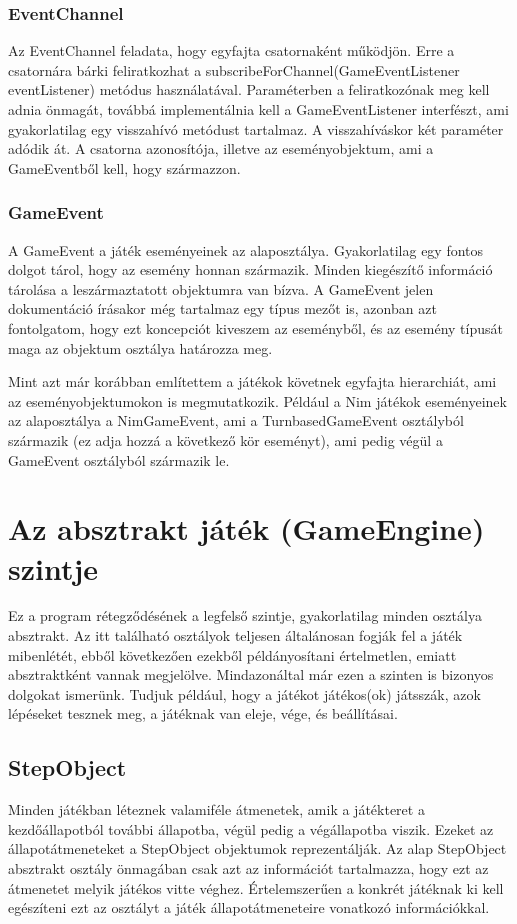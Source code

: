 \subsubsection{EventChannel}
Az EventChannel feladata, hogy egyfajta csatornaként működjön. Erre a csatornára bárki feliratkozhat a subscribeForChannel(GameEventListener eventListener) metódus használatával. Paraméterben a feliratkozónak meg kell adnia önmagát, továbbá implementálnia kell a GameEventListener interfészt, ami gyakorlatilag egy visszahívó metódust tartalmaz. A visszahíváskor két paraméter adódik át. A csatorna azonosítója, illetve az eseményobjektum, ami a GameEventből kell, hogy származzon.

\subsubsection{GameEvent}
A GameEvent a játék eseményeinek az alaposztálya. Gyakorlatilag egy fontos dolgot tárol, hogy az esemény honnan származik. Minden kiegészítő információ tárolása a leszármaztatott objektumra van bízva. A GameEvent jelen dokumentáció írásakor még tartalmaz egy típus mezőt is, azonban azt fontolgatom, hogy ezt koncepciót kiveszem az eseményből, és az esemény típusát maga az objektum osztálya határozza meg.\ujsor

Mint azt már korábban említettem a játékok követnek egyfajta hierarchiát, ami az eseményobjektumokon is megmutatkozik. Például a Nim játékok eseményeinek az alaposztálya a NimGameEvent, ami a TurnbasedGameEvent osztályból származik (ez adja hozzá a következő kör eseményt), ami pedig végül a GameEvent osztályból származik le.

\section{Az absztrakt játék (GameEngine) szintje}
Ez a program rétegződésének a legfelső szintje, gyakorlatilag minden osztálya absztrakt. Az itt található osztályok teljesen általánosan fogják fel a játék mibenlétét, ebből következően ezekből példányosítani értelmetlen, emiatt absztraktként vannak megjelölve. Mindazonáltal már ezen a szinten is bizonyos dolgokat ismerünk. Tudjuk például, hogy a játékot játékos(ok) játsszák, azok lépéseket tesznek meg, a játéknak van eleje, vége, és beállításai.

\subsection{StepObject}
Minden játékban léteznek valamiféle átmenetek, amik a játékteret a kezdőállapotból további állapotba, végül pedig a végállapotba viszik. Ezeket az állapotátmeneteket a StepObject objektumok reprezentálják. Az alap StepObject absztrakt osztály önmagában csak azt az információt tartalmazza, hogy ezt az átmenetet melyik játékos vitte véghez. Értelemszerűen a konkrét játéknak ki kell egészíteni ezt az osztályt a játék állapotátmeneteire vonatkozó információkkal.

